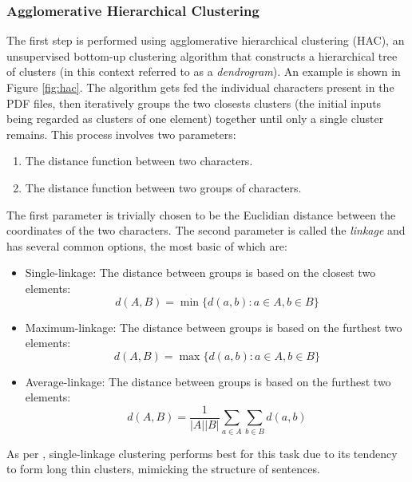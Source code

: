 \subsubsection*{Agglomerative Hierarchical Clustering}
The first step is performed using agglomerative hierarchical clustering (HAC),
an unsupervised bottom-up clustering algorithm that constructs a hierarchical
tree of clusters (in this context referred to as a \emph{dendrogram}). An
example is shown in Figure \ref{fig:hac}. The algorithm gets fed the individual
characters present in the PDF files, then iteratively groups the two closests
clusters (the initial inputs being regarded as clusters of one element) together
until only a single cluster remains. This process involves two parameters:
\begin{enumerate}
\item The distance function between two characters.
\item The distance function between two groups of characters.
\end{enumerate}
The first parameter is trivially chosen to be the Euclidian distance between the
coordinates of the two characters. The second parameter is called the
\emph{linkage} and has several common options, the most basic of which are:
\begin{itemize}
\item Single-linkage: The distance between groups is based on the closest two
  elements: \[ d(A, B) = \min \{ d(a, b) : a \in A, b \in B \} \]
\item Maximum-linkage: The distance between groups is based on the furthest two
  elements: \[ d(A, B) = \max \{ d(a, b) : a \in A, b \in B \} \]
\item Average-linkage: The distance between groups is based on the furthest two
  elements: \[ d(A, B) = \frac{1}{|A||B|} \sum_{a \in A}\sum_{b \in B} d(a, b) \]
\end{itemize}
As per \cite{klampfl2014unsupervised}, single-linkage clustering performs best
for this task due to its tendency to form long thin clusters, mimicking the
structure of sentences.

